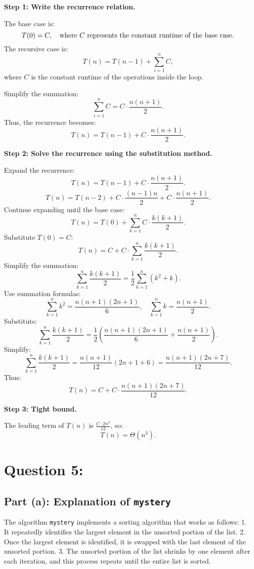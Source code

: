 \documentclass{article}
\begin{document}
\textbf{Step 1: Write the recurrence relation.}

The base case is:
\[
T(0) = C, \quad \text{where \( C \) represents the constant runtime of the base case.}
\]
The recursive case is:
\[
T(n) = T(n-1) + \sum_{i=1}^{n} C,
\]
where \( C \) is the constant runtime of the operations inside the loop.

Simplify the summation:
\[
\sum_{i=1}^{n} C = C \cdot \frac{n(n+1)}{2}.
\]
Thus, the recurrence becomes:
\[
T(n) = T(n-1) + C \cdot \frac{n(n+1)}{2}.
\]

\textbf{Step 2: Solve the recurrence using the substitution method.}

Expand the recurrence:
\[
T(n) = T(n-1) + C \cdot \frac{n(n+1)}{2}.
\]
\[
T(n) = T(n-2) + C \cdot \frac{(n-1)n}{2} + C \cdot \frac{n(n+1)}{2}.
\]
Continue expanding until the base case:
\[
T(n) = T(0) + \sum_{k=1}^{n} C \cdot \frac{k(k+1)}{2}.
\]
Substitute \( T(0) = C \):
\[
T(n) = C + C \cdot \sum_{k=1}^{n} \frac{k(k+1)}{2}.
\]
Simplify the summation:
\[
\sum_{k=1}^{n} \frac{k(k+1)}{2} = \frac{1}{2} \sum_{k=1}^{n} (k^2 + k).
\]
Use summation formulas:
\[
\sum_{k=1}^{n} k^2 = \frac{n(n+1)(2n+1)}{6}, \quad \sum_{k=1}^{n} k = \frac{n(n+1)}{2}.
\]
Substitute:
\[
\sum_{k=1}^{n} \frac{k(k+1)}{2} = \frac{1}{2} \left( \frac{n(n+1)(2n+1)}{6} + \frac{n(n+1)}{2} \right).
\]
Simplify:
\[
\sum_{k=1}^{n} \frac{k(k+1)}{2} = \frac{n(n+1)}{12} \left( 2n+1 + 6 \right) = \frac{n(n+1)(2n+7)}{12}.
\]
Thus:
\[
T(n) = C + C \cdot \frac{n(n+1)(2n+7)}{12}.
\]

\textbf{Step 3: Tight bound.}

The leading term of \( T(n) \) is \( \frac{C \cdot 2n^3}{12} \), so:
\[
T(n) = \Theta(n^3).
\]
\pagebreak
\section*{Question 5:}
\subsection*{Part (a): Explanation of \texttt{mystery}}

The algorithm \texttt{mystery} implements a sorting algorithm that works as follows:
1. It repeatedly identifies the largest element in the unsorted portion of the list.
2. Once the largest element is identified, it is swapped with the last element of the unsorted portion.
3. The unsorted portion of the list shrinks by one element after each iteration, and this process repeats until the entire list is sorted.
\end{document}
